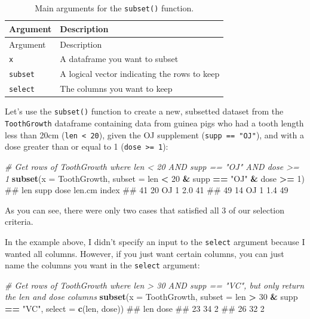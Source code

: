 \documentclass[]{book}
\newenvironment{Shaded}{\begin{snugshade}}{\end{snugshade}}
\newcommand{\KeywordTok}[1]{\textcolor[rgb]{0.13,0.29,0.53}{\textbf{#1}}}
\newcommand{\DataTypeTok}[1]{\textcolor[rgb]{0.13,0.29,0.53}{#1}}
\newcommand{\DecValTok}[1]{\textcolor[rgb]{0.00,0.00,0.81}{#1}}
\newcommand{\StringTok}[1]{\textcolor[rgb]{0.31,0.60,0.02}{#1}}
\newcommand{\CommentTok}[1]{\textcolor[rgb]{0.56,0.35,0.01}{\textit{#1}}}
\newcommand{\OperatorTok}[1]{\textcolor[rgb]{0.81,0.36,0.00}{\textbf{#1}}}
\newcommand{\NormalTok}[1]{#1}
\theoremstyle{definition}
\theoremstyle{definition}
\theoremstyle{remark}
\begin{document}
\begin{longtable}[]{@{}ll@{}}
\caption{\label{tab:subsetfunction} Main arguments for the \texttt{subset()}
function.}\tabularnewline
\toprule
Argument & Description\tabularnewline
\midrule
\endfirsthead
\toprule
Argument & Description\tabularnewline
\midrule
\endhead
\texttt{x} & A dataframe you want to subset\tabularnewline
\texttt{subset} & A logical vector indicating the rows to
keep\tabularnewline
\texttt{select} & The columns you want to keep\tabularnewline
\bottomrule
\end{longtable}

Let's use the \texttt{subset()} function to create a new, subsetted
dataset from the \texttt{ToothGrowth} dataframe containing data from
guinea pigs who had a tooth length less than 20cm
(\texttt{len\ \textless{}\ 20}), given the OJ supplement
(\texttt{supp\ ==\ "OJ"}), and with a dose greater than or equal to 1
(\texttt{dose\ \textgreater{}=\ 1}):

\begin{Shaded}
\begin{Highlighting}[]
\CommentTok{# Get rows of ToothGrowth where len < 20 AND supp == "OJ" AND dose >= 1}
\KeywordTok{subset}\NormalTok{(}\DataTypeTok{x =}\NormalTok{ ToothGrowth,}
      \DataTypeTok{subset =}\NormalTok{ len }\OperatorTok{<}\StringTok{ }\DecValTok{20} \OperatorTok{&}
\StringTok{               }\NormalTok{supp }\OperatorTok{==}\StringTok{ "OJ"} \OperatorTok{&}
\StringTok{               }\NormalTok{dose }\OperatorTok{>=}\StringTok{ }\DecValTok{1}\NormalTok{)}
\NormalTok{##    len supp dose len.cm index}
\NormalTok{## 41  20   OJ    1    2.0    41}
\NormalTok{## 49  14   OJ    1    1.4    49}
\end{Highlighting}
\end{Shaded}

As you can see, there were only two cases that satisfied all 3 of our
selection criteria.

In the example above, I didn't specify an input to the \texttt{select}
argument because I wanted all columns. However, if you just want certain
columns, you can just name the columns you want in the \texttt{select}
argument:

\begin{Shaded}
\begin{Highlighting}[]
\CommentTok{# Get rows of ToothGrowth where len > 30 AND supp == "VC", but only return the len and dose columns}
\KeywordTok{subset}\NormalTok{(}\DataTypeTok{x =}\NormalTok{ ToothGrowth,}
    \DataTypeTok{subset =}\NormalTok{ len }\OperatorTok{>}\StringTok{ }\DecValTok{30} \OperatorTok{&}\StringTok{ }\NormalTok{supp }\OperatorTok{==}\StringTok{ "VC"}\NormalTok{,}
    \DataTypeTok{select =} \KeywordTok{c}\NormalTok{(len, dose))}
\NormalTok{##    len dose}
\NormalTok{## 23  34    2}
\NormalTok{## 26  32    2}
\end{Highlighting}
\end{Shaded}
\end{document}

